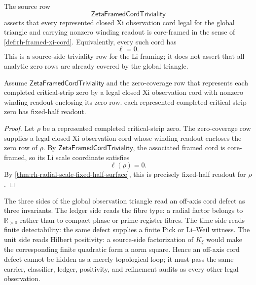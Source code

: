 \begin{definition}
\label{def:rh-zeta-framed-cord-triviality}
The source row
$$
\mathsf{ZetaFramedCordTriviality}
$$
asserts that every represented closed Xi observation cord legal for the
global triangle and carrying nonzero winding readout is core-framed in
the sense of \autoref{def:rh-framed-xi-cord}.  Equivalently, every such
cord has
$$
\ell=0.
$$
This is a source-side triviality row for the Li framing; it does not
assert that all analytic zero rows are already covered by the global
triangle.
\end{definition}

\begin{theorem}
\label{thm:rh-framed-cord-triviality-fixed-half-readout}
Assume $\mathsf{ZetaFramedCordTriviality}$ and the zero-coverage row
that represents each completed critical-strip zero by a legal closed Xi
observation cord with nonzero winding readout enclosing its zero row.
each represented completed critical-strip zero has fixed-half readout.
\end{theorem}

\begin{proof}
Let $\rho$ be a represented completed critical-strip zero.  The
zero-coverage row supplies a legal closed Xi observation cord whose
winding readout encloses the zero row of $\rho$.  By
$\mathsf{ZetaFramedCordTriviality}$, the associated framed cord is
core-framed, so its Li scale coordinate satisfies
$$
\ell(\rho)=0.
$$
By \autoref{thm:rh-radial-scale-fixed-half-surface}, this is precisely
fixed-half readout for $\rho$.
\end{proof}

\begin{principle}
\label{prin:rh-cord-invariants-triadic}
The three sides of the global observation triangle read an off-axis cord
defect as three invariants.  The ledger side reads the fibre type: a
radial factor belongs to $\mathbb R_{>0}$ rather than to compact phase
or prime-register fibres.  The time side reads finite detectability:
the same defect supplies a finite Pick or Li--Weil witness.  The unit
side reads Hilbert positivity: a source-side factorization of
$K_{\xi}$ would make the corresponding finite quadratic form a norm
square.  Hence an off-axis cord defect cannot be hidden as a merely
topological loop; it must pass the same carrier, classifier, ledger,
positivity, and refinement audits as every other legal observation.
\end{principle}


